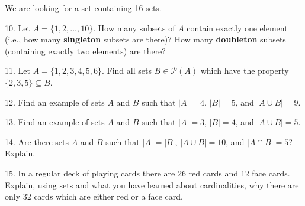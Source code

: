\documentclass[12pt,]{book}
\newcommand{\terminology}[1]{\textbf{#1}}
\theoremstyle{plain}
\theoremstyle{definition}
\theoremstyle{definition}
\theoremstyle{definition}
\numberwithin{equation}{chapter}
\newcommand{\pow}{\mathcal P}
\begin{document}
\begin{exerciselist}
\hypertarget{p-692}{}%
We are looking for a set containing 16 sets.%
\item[10.]\hypertarget{exercise-82}{}\hypertarget{p-693}{}%
Let \(A = \{1,2,\ldots, 10\}\). How many subsets of \(A\) contain exactly one element (i.e., how many \terminology{singleton} subsets are there)? How many \terminology{doubleton} subsets (containing exactly two elements) are there?%
\par\smallskip
\item[11.]\hypertarget{exercise-83}{}\hypertarget{p-694}{}%
Let \(A = \{1,2,3,4,5,6\}\). Find all sets \(B \in \pow(A)\) which have the property \(\{2,3,5\} \subseteq B\).%
\par\smallskip
\item[12.]\hypertarget{exercise-84}{}\hypertarget{p-695}{}%
Find an example of sets \(A\) and \(B\) such that \(|A| = 4\), \(|B| = 5\), and \(|A \cup B| = 9\).%
\par\smallskip
\item[13.]\hypertarget{exercise-85}{}\hypertarget{p-697}{}%
Find an example of sets \(A\) and \(B\) such that \(|A| = 3\), \(|B| = 4\), and \(|A \cup B| = 5\).%
\par\smallskip
\item[14.]\hypertarget{exercise-86}{}\hypertarget{p-698}{}%
Are there sets \(A\) and \(B\) such that \(|A| = |B|\), \(|A\cup B| = 10\), and \(|A\cap B| = 5\)? Explain.%
\par\smallskip
\item[15.]\hypertarget{exercise-87}{}\hypertarget{p-699}{}%
In a regular deck of playing cards there are 26 red cards and 12 face cards. Explain, using sets and what you have learned about cardinalities, why there are only 32 cards which are either red or a face card.%
\par\smallskip
\end{exerciselist}
\typeout{************************************************}
\typeout{************************************************}
\end{document}
